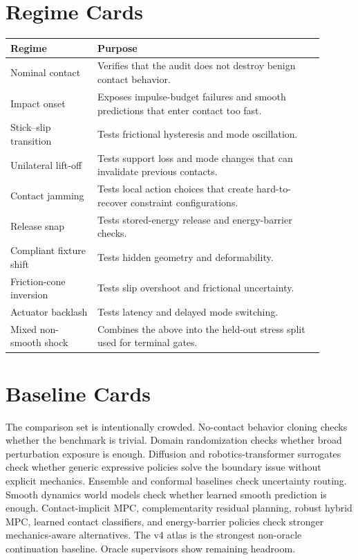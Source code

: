 \documentclass{article}
\begin{document}
\section{Regime Cards}
\begin{longtable}{p{0.25\linewidth}p{0.65\linewidth}}
\toprule
Regime & Purpose \\
\midrule
Nominal contact & Verifies that the audit does not destroy benign contact behavior. \\
Impact onset & Exposes impulse-budget failures and smooth predictions that enter contact too fast. \\
Stick--slip transition & Tests frictional hysteresis and mode oscillation. \\
Unilateral lift-off & Tests support loss and mode changes that can invalidate previous contacts. \\
Contact jamming & Tests local action choices that create hard-to-recover constraint configurations. \\
Release snap & Tests stored-energy release and energy-barrier checks. \\
Compliant fixture shift & Tests hidden geometry and deformability. \\
Friction-cone inversion & Tests slip overshoot and frictional uncertainty. \\
Actuator backlash & Tests latency and delayed mode switching. \\
Mixed non-smooth shock & Combines the above into the held-out stress split used for terminal gates. \\
\bottomrule
\end{longtable}

\section{Baseline Cards}
The comparison set is intentionally crowded. No-contact behavior cloning checks whether the benchmark is trivial. Domain randomization checks whether broad perturbation exposure is enough. Diffusion and robotics-transformer surrogates check whether generic expressive policies solve the boundary issue without explicit mechanics. Ensemble and conformal baselines check uncertainty routing. Smooth dynamics world models check whether learned smooth prediction is enough. Contact-implicit MPC, complementarity residual planning, robust hybrid MPC, learned contact classifiers, and energy-barrier policies check stronger mechanics-aware alternatives. The v4 atlas is the strongest non-oracle continuation baseline. Oracle supervisors show remaining headroom.
\end{document}
